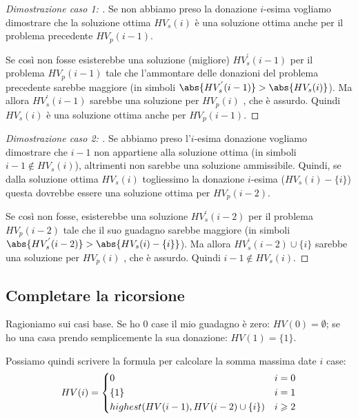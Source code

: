 \begin{proof}[Dimostrazione caso 1: ]
Se non abbiamo preso la donazione \(i\)-esima vogliamo dimostrare che la soluzione ottima \(HV_{s}(i)\) è una soluzione ottima anche per il problema precedente \(HV_{p}(i-1)\).

Se così non fosse esisterebbe una soluzione (migliore) \(HV_{s}^{'} (i-1)\) per il problema \(HV_{p}(i-1)\) tale che l'ammontare delle donazioni del problema precedente sarebbe maggiore (in simboli \(\abs{HV_{s}^{'} (i-1)} > \abs{HV_{s}(i)}\)).
Ma allora \(HV_{s}^{'} (i-1)\) sarebbe una soluzione per \(HV_{p}(i)\)%
, che è assurdo.
Quindi \(HV_{s}(i)\) è una soluzione ottima anche per \(HV_{p}(i-1)\).
\end{proof}

\begin{proof}[Dimostrazione caso 2: ]
Se abbiamo preso l'\(i\)-esima donazione vogliamo dimostrare che \(i-1\) non appartiene alla soluzione ottima (in simboli \(i-1 \not\in HV_{s}(i)\)), altrimenti non sarebbe una soluzione ammissibile.
Quindi, se dalla soluzione ottima \(HV_{s}(i)\) togliessimo la donazione \(i\)-esima (\(HV_{s}(i) - \{i\}\)) questa dovrebbe essere una soluzione ottima per \(HV_{p} (i-2)\).

Se così non fosse, esisterebbe una soluzione \(HV_{s}^{'} (i-2)\) per il problema \(HV_{p} (i-2)\) tale che il suo guadagno sarebbe maggiore (in simboli \(\abs{HV_{s}^{'} (i-2)} > \abs{HV_{s} (i) - \{i\}}\)).
Ma allora \(HV_{s}^{'} (i-2) \cup \{i\}\) sarebbe una soluzione per \(HV_{p}(i)\)%
, che è assurdo.
Quindi \(i-1 \not\in HV_s(i)\).
\end{proof}

\subsection{Completare la ricorsione}

Ragioniamo sui casi base.
Se ho \(0\) case il mio guadagno è zero: \(HV(0) = \emptyset\);
se ho una casa prendo semplicemente la sua donazione: \(HV(1) = \{1\}\).

Possiamo quindi scrivere la formula per calcolare la somma massima date \(i\) case:
\[
    HV(i) =
    \begin{dcases}
        0                                    & i = 0         \\
        \{1\}                                & i = 1         \\
        highest(HV(i-1), HV(i-2) \cup \{i\}) & i \geqslant 2 \\
    \end{dcases}
\]

